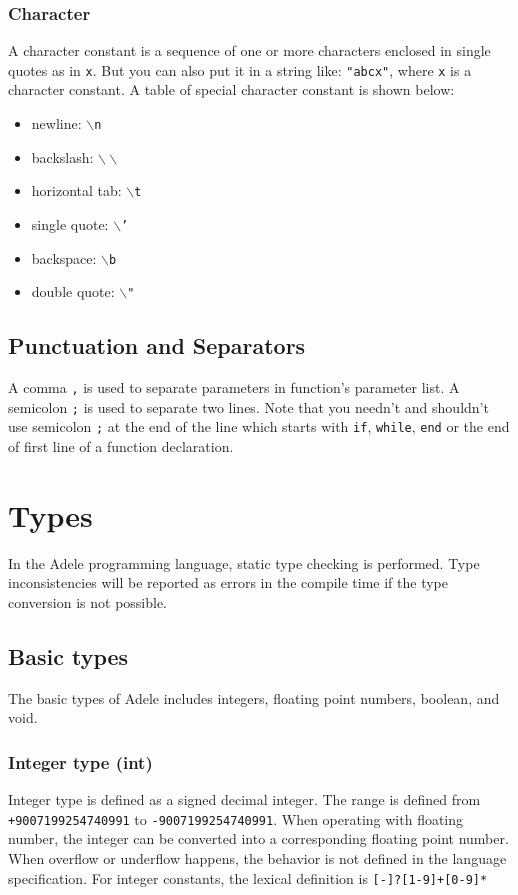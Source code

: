\documentclass[11pt,letterpaper]{article}
\begin{document}
\subsubsection* {Character}
A character constant is a sequence of one or more characters enclosed in single quotes as in \texttt{x}. But you can also put it in a string like: \texttt{"abcx"}, where \texttt{x} is a character constant. A table of special character constant is shown below:
\begin{itemize}
	\item newline: \texttt{$\backslash$n}
	\item backslash: \texttt{$\backslash\backslash$}              
	\item horizontal tab: \texttt{$\backslash$t}         
    \item single quote: \texttt{$\backslash$'}         
    \item backspace: \texttt{$\backslash$b}             
    \item double quote: \texttt{$\backslash$"}  
\end{itemize}

\subsection {Punctuation and Separators}
A comma \texttt {,} is used to separate parameters in function's parameter list. A semicolon \texttt{;} is used to separate two lines. Note that you needn't and shouldn't use semicolon \texttt{;} at the end of the line which starts with \texttt{if}, \texttt{while}, \texttt{end} or the end of first line of a function declaration. 

\section {Types}
In the Adele programming language, static type checking is performed. Type inconsistencies will be reported as errors in the compile time if the type conversion is not possible. 

\subsection{Basic types}
The basic types of Adele includes integers, floating point numbers, boolean, and void.

\subsubsection*{Integer type (int)} 
Integer type is defined as a signed decimal integer. The range is defined from \texttt{+9007199254740991} to \texttt{-9007199254740991}. When operating with floating number, the integer can be converted into a corresponding floating point number. When overflow or underflow happens, the behavior is not defined in the language specification. For integer constants, the lexical definition is \texttt{[-]?[1-9]+[0-9]* \textbar [0]}
\end{document}
